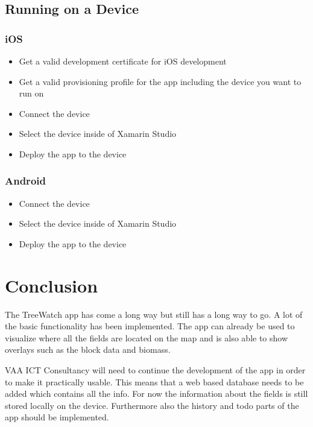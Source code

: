 \subsection{Running on a Device}

\subsubsection{iOS}
\begin{itemize}
\item Get a valid development certificate for iOS development
\item Get a valid provisioning profile for the app including the device you want to run on
\item Connect the device
\item Select the device inside of Xamarin Studio
\item Deploy the app to the device
\end{itemize}
\subsubsection{Android}
\begin{itemize}
\item Connect the device
\item Select the device inside of Xamarin Studio
\item Deploy the app to the device
\end{itemize}

\pagebreak
\section{Conclusion}
The TreeWatch app has come a long way but still has a long way to go. A lot of the basic functionality has been implemented. The app can already be used to visualize where all the fields are located on the map and is also able to show overlays such as the block data and biomass.

VAA ICT Consultancy will need to continue the development of the app in order to make it practically usable. This means that a web based database needs to be added which contains all the info. For now the information about the fields is still stored locally on the device. Furthermore also the history and todo parts of the app should be implemented.


